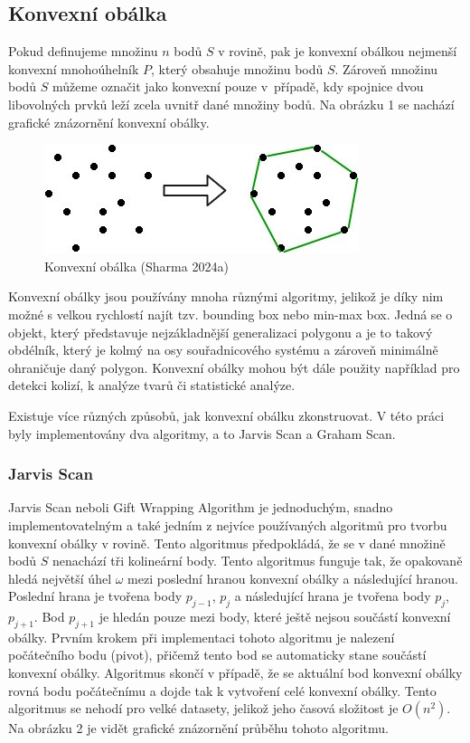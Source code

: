 \documentclass{article}
\begin{document}
\begin{spacing}{1.5}
\subsection{Konvexní obálka}
Pokud definujeme množinu $n$ bodů $S$ v rovině, pak je konvexní obálkou nejmenší konvexní mnohoúhelník $P$, který obsahuje množinu bodů $S$. Zároveň množinu bodů $S$ můžeme označit jako konvexní pouze v~případě, kdy spojnice dvou libovolných prvků leží zcela uvnitř dané množiny bodů. Na obrázku 1 se nachází grafické znázornění konvexní obálky. 

\begin{figure}[h]
    \centering
    \includegraphics[width=0.7\linewidth]{images/convex.jpg}
    \caption{Konvexní obálka (Sharma 2024a)}
    \label{fig:enter-label}
\end{figure}

Konvexní obálky jsou používány mnoha různými algoritmy, jelikož je díky nim možné s velkou rychlostí najít tzv. bounding box nebo min-max box. Jedná se o objekt, který představuje nejzákladnější generalizaci polygonu a je to takový obdélník, který je kolmý na osy souřadnicového systému a zároveň minimálně ohraničuje daný polygon. Konvexní obálky mohou být dále použity například pro detekci kolizí, k analýze tvarů či statistické analýze.

Existuje více různých způsobů, jak konvexní obálku zkonstruovat. V této práci byly implementovány dva algoritmy, a to Jarvis Scan a Graham Scan. 

\subsubsection{Jarvis Scan }
Jarvis Scan neboli Gift Wrapping Algorithm je jednoduchým, snadno implementovatelným a také jedním z nejvíce používaných algoritmů pro tvorbu konvexní obálky v rovině. Tento algoritmus předpokládá, že se v dané množině bodů $S$ nenachází tři kolineární body. Tento algoritmus funguje tak, že opakovaně hledá největší úhel $\omega$ mezi poslední hranou konvexní obálky a následující hranou. Poslední hrana je tvořena body $p_{j-1}$, $p_j$ a následující hrana je tvořena body $p_j$, $p_{j+1}$. Bod $p_{j+1}$ je hledán pouze mezi body, které ještě nejsou součástí konvexní obálky. Prvním krokem při implementaci tohoto algoritmu je nalezení počátečního bodu (pivot), přičemž tento bod se automaticky stane součástí konvexní obálky. Algoritmus skončí v případě, že se aktuální bod konvexní obálky rovná bodu počátečnímu a dojde tak k vytvoření celé konvexní obálky. Tento algoritmus se nehodí pro velké datasety, jelikož jeho časová složitost je $O(n^2)$. Na obrázku 2 je vidět grafické znázornění průběhu tohoto algoritmu.


\end{spacing}
\end{document}
